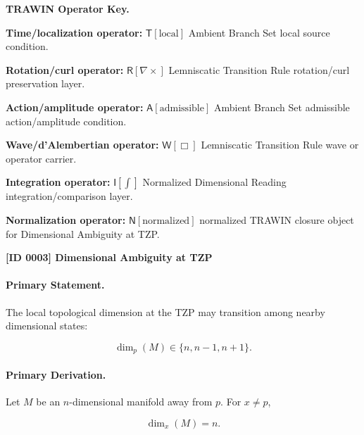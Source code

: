 \par\vspace{0.45\baselineskip}
\noindent\begin{minipage}[t]{\linewidth}
\begingroup
\small
\raggedright
\textbf{TRAWIN Operator Key.}\par
\noindent\textbf{Time/localization operator:} $\mathsf{T}\!\left[\mathrm{local}\right]$ Ambient Branch Set local source condition.\par
\noindent\textbf{Rotation/curl operator:} $\mathsf{R}\!\left[\nabla\times\right]$ Lemniscatic Transition Rule rotation/curl preservation layer.\par
\noindent\textbf{Action/amplitude operator:} $\mathsf{A}\!\left[\mathrm{admissible}\right]$ Ambient Branch Set admissible action/amplitude condition.\par
\noindent\textbf{Wave/d'Alembertian operator:} $\mathsf{W}\!\left[\Box\right]$ Lemniscatic Transition Rule wave or operator carrier.\par
\noindent\textbf{Integration operator:} $\mathsf{I}\!\left[\int\right]$ Normalized Dimensional Reading integration/comparison layer.\par
\noindent\textbf{Normalization operator:} $\mathsf{N}\!\left[\mathrm{normalized}\right]$ normalized TRAWIN closure object for Dimensional Ambiguity at TZP.\par
\endgroup
\end{minipage}

\clearpage
\noindent\textbf{[ID 0003] Dimensional Ambiguity at TZP}\par
\vspace{0.35em}
\paragraph{Primary Statement.}
The local topological dimension at the TZP may transition among nearby dimensional states:

\begin{equation}
\dim_p(M)\in\{n,n-1,n+1\}.
\end{equation}

\paragraph{Primary Derivation.}
Let $M$ be an $n$-dimensional manifold away from $p$. For $x\neq p$,

\begin{equation}
\dim_x(M)=n .
\end{equation}

